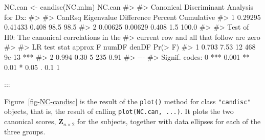 \documentclass[
  letterpaper,
  10pt,
  krantz2]{krantz}
\makeatletter
\newenvironment{Shaded}{\begin{snugshade}}{\end{snugshade}}
\newcommand{\CommentTok}[1]{\textcolor[rgb]{0.37,0.37,0.37}{#1}}
\newcommand{\FunctionTok}[1]{\textcolor[rgb]{0.28,0.35,0.67}{#1}}
\newcommand{\NormalTok}[1]{\textcolor[rgb]{0.00,0.23,0.31}{#1}}
\newcommand{\OtherTok}[1]{\textcolor[rgb]{0.00,0.23,0.31}{#1}}
\newenvironment{kframe}{%
  \medskip{}
  \setlength{\fboxsep}{.8em}
  \def\at@end@of@kframe{}%
  \ifinner\ifhmode%
  \def\at@end@of@kframe{\end{minipage}}%
  \begin{minipage}{\columnwidth}%
  \fi\fi%
  \def\FrameCommand##1{\hskip\@totalleftmargin \hskip-\fboxsep
  \colorbox{shadecolor}{##1}\hskip-\fboxsep
      \hskip-\linewidth \hskip-\@totalleftmargin \hskip\columnwidth}%
  \MakeFramed {\advance\hsize-\width
    \@totalleftmargin\z@ \linewidth\hsize
    \@setminipage}}%
{\par\unskip\endMakeFramed%
  \at@end@of@kframe}
\renewenvironment{Shaded}{\begin{kframe}}{\end{kframe}}
\makeatother
\begin{document}
\begin{Shaded}
\begin{Highlighting}[]
\NormalTok{NC.can }\OtherTok{\textless{}{-}} \FunctionTok{candisc}\NormalTok{(NC.mlm)}
\NormalTok{NC.can}
\CommentTok{\#\textgreater{} }
\CommentTok{\#\textgreater{} Canonical Discriminant Analysis for Dx:}
\CommentTok{\#\textgreater{} }
\CommentTok{\#\textgreater{}    CanRsq Eigenvalue Difference Percent Cumulative}
\CommentTok{\#\textgreater{} 1 0.29295    0.41433      0.408    98.5       98.5}
\CommentTok{\#\textgreater{} 2 0.00625    0.00629      0.408     1.5      100.0}
\CommentTok{\#\textgreater{} }
\CommentTok{\#\textgreater{} Test of H0: The canonical correlations in the }
\CommentTok{\#\textgreater{} current row and all that follow are zero}
\CommentTok{\#\textgreater{} }
\CommentTok{\#\textgreater{}   LR test stat approx F numDF denDF Pr(\textgreater{} F)    }
\CommentTok{\#\textgreater{} 1        0.703     7.53    12   468   9e{-}13 ***}
\CommentTok{\#\textgreater{} 2        0.994     0.30     5   235    0.91    }
\CommentTok{\#\textgreater{} {-}{-}{-}}
\CommentTok{\#\textgreater{} Signif. codes:  0 \textquotesingle{}***\textquotesingle{} 0.001 \textquotesingle{}**\textquotesingle{} 0.01 \textquotesingle{}*\textquotesingle{} 0.05 \textquotesingle{}.\textquotesingle{} 0.1 \textquotesingle{} \textquotesingle{} 1}
\end{Highlighting}
\end{Shaded}

:::

Figure~\ref{fig-NC-candisc} is the result of the \texttt{plot()} method
for class \texttt{"candisc"} objects, that is, the result of calling
\texttt{plot(NC.can,\ ...)}. It plots the two canonical scores,
\(\mathbf{Z}_{n \times 2}\) for the subjects, together with data
ellipses for each of the three groups.
\end{document}

